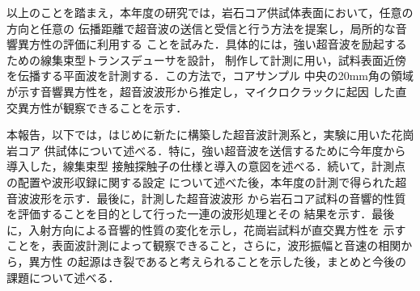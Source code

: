 以上のことを踏まえ，本年度の研究では，岩石コア供試体表面において，任意の方向と任意の
伝播距離で超音波の送信と受信と行う方法を提案し，局所的な音響異方性の評価に利用する
ことを試みた．具体的には，強い超音波を励起するための線集束型トランスデューサを設計，
制作して計測に用い，試料表面近傍を伝播する平面波を計測する．この方法で，コアサンプル
中央の20mm角の領域が示す音響異方性を，超音波波形から推定し，マイクロクラックに起因
した直交異方性が観察できることを示す．

本報告，以下では，はじめに新たに構築した超音波計測系と，実験に用いた花崗岩コア
供試体について述べる．特に，強い超音波を送信するために今年度から導入した，線集束型
接触探触子の仕様と導入の意図を述べる．続いて，計測点の配置や波形収録に関する設定
について述べた後，本年度の計測で得られた超音波波形を示す．最後に，計測した超音波波形
から岩石コア試料の音響的性質を評価することを目的として行った一連の波形処理とその
結果を示す．最後に，入射方向による音響的性質の変化を示し，花崗岩試料が直交異方性を
示すことを，表面波計測によって観察できること，さらに，波形振幅と音速の相関から，異方性
の起源はき裂であると考えられることを示した後，まとめと今後の課題について述べる．
